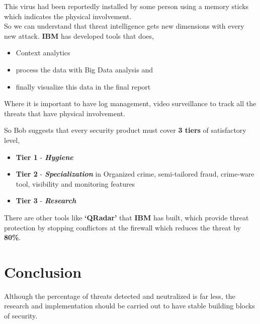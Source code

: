 \documentclass{article}
\begin{document}
This virus had been reportedly installed by some person using a memory sticks which indicates the physical involvement.\\

So we can understand that threat intelligence gets new dimensions with every new attack. \textbf{IBM} has developed tools that does, 
\begin{itemize}
\item Context analytics\\
\item process the data with Big Data analysis and\\
\item finally visualize this data in the final report\\
\end{itemize}

Where it is important to have log management, video surveillance to track all the threats that have physical involvement.

So Bob suggests that every security product must cover \textbf{3 tiers} of satisfactory level, 
\begin{itemize}
\item \textbf{Tier 1} - \textbf{\textit{Hygiene}}
\item \textbf{Tier 2} - \textbf{\textit{Specialization}} in Organized crime, semi-tailored fraud, crime-ware tool, visibility and monitoring features
\item \textbf{Tier 3} - \textbf{\textit{Research}}
\end{itemize}
There are other tools like \textbf{‘QRadar’} that \textbf{IBM} has built, which provide threat protection by stopping conflictors at the firewall which reduces the threat by \textbf{80\%}.\\

\section*{Conclusion}
Although the percentage of threats detected and neutralized is far less, the research and implementation should be carried out to have stable building blocks of security.
\end{document}
